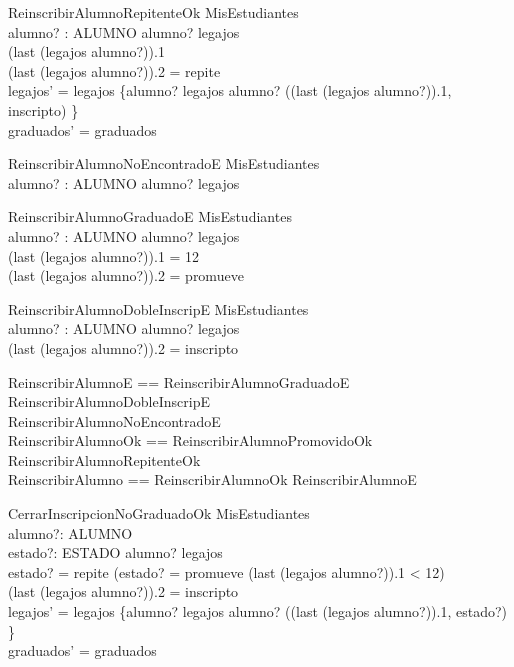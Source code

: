 \begin{schema}{ReinscribirAlumnoRepitenteOk}
    \Delta MisEstudiantes \\
    alumno? : ALUMNO
    \where
    alumno? \in \dom legajos \\
    (last \; (legajos \; alumno?)).1  \\ 
    (last \; (legajos \; alumno?)).2 = repite \\
    legajos' = legajos \oplus \{alumno? \mapsto legajos \; alumno? \cat \langle ((last \; (legajos \; alumno?)).1, inscripto) \rangle\} \\
    graduados' = graduados
\end{schema}

\begin{schema}{ReinscribirAlumnoNoEncontradoE}
    \Xi MisEstudiantes \\
    alumno? : ALUMNO
    \where
    alumno? \notin \dom legajos
\end{schema}

\begin{schema}{ReinscribirAlumnoGraduadoE}
    \Xi MisEstudiantes \\
    alumno? : ALUMNO
    \where
    alumno? \in \dom legajos \\
    (last \; (legajos \; alumno?)).1 = 12 \\
    (last \; (legajos \; alumno?)).2 = promueve 
\end{schema}

\begin{schema}{ReinscribirAlumnoDobleInscripE}
    \Xi MisEstudiantes \\
    alumno? : ALUMNO
    \where
    alumno? \in \dom legajos \\
    (last \; (legajos \; alumno?)).2 = inscripto
\end{schema}

\begin{zed}
    ReinscribirAlumnoE == ReinscribirAlumnoGraduadoE \lor ReinscribirAlumnoDobleInscripE \\
                             \lor ReinscribirAlumnoNoEncontradoE \\
    ReinscribirAlumnoOk == ReinscribirAlumnoPromovidoOk \lor ReinscribirAlumnoRepitenteOk \\
    ReinscribirAlumno == ReinscribirAlumnoOk \lor ReinscribirAlumnoE
\end{zed}

\begin{schema}{CerrarInscripcionNoGraduadoOk}
    \Delta MisEstudiantes \\
    alumno?: ALUMNO \\
    estado?: ESTADO
    \where
    alumno? \in \dom legajos \\
    estado? = repite \lor (estado? = promueve \land (last \; (legajos \; alumno?)).1 < 12) \\
    (last \; (legajos \; alumno?)).2 = inscripto \\
    legajos' = legajos \oplus \{alumno? \mapsto legajos \; alumno? \cat \langle ((last \; (legajos \; alumno?)).1, estado?) \rangle\} \\
    graduados' = graduados
\end{schema}

